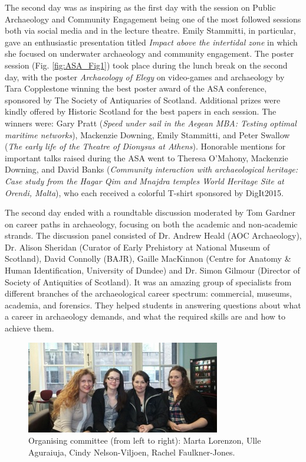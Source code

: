 	The second day was as inspiring as the first day with the session on Public Archaeology and Community Engagement being one of the most followed sessions both via social media and in the lecture theatre. Emily Stammitti, in particular, gave an enthusiastic presentation titled \textit{Impact above the intertidal zone} in which she focused on underwater archaeology and community engagement. The poster session (Fig. \ref{fig:ASA_Fig1}) took place during the lunch break on the second day, with the poster \textit{Archaeology of Elegy} on video-games and archaeology by Tara Copplestone winning the best poster award of the  ASA conference, sponsored by The Society of Antiquaries of Scotland. Additional prizes were kindly offered by Historic Scotland for the best papers in each session. The winners were: Gary Pratt (\textit{Speed under sail in the Aegean MBA: Testing optimal maritime networks}), Mackenzie Downing, Emily Stammitti, and Peter Swallow (\textit{The early life of the Theatre of Dionysus at Athens}). Honorable mentions for important talks raised during the  ASA went to Theresa O'Mahony, Mackenzie Downing, and David Banks (\textit{Community interaction with archaeological heritage: Case study from the Hagar Qim and Mnajdra temples World Heritage Site at Orendi, Malta}), who each received a colorful T-shirt sponsored by DigIt2015.
	

The second day ended with a roundtable discussion moderated by Tom Gardner on career paths in archaeology, focusing on both the academic and non-academic strands. The discussion panel consisted of Dr. Andrew Heald (AOC Archaeology), Dr. Alison Sheridan (Curator of Early Prehistory at National Museum of Scotland), David Connolly (BAJR), Gaille MacKinnon (Centre for Anatomy \& Human Identification, University of Dundee) and Dr. Simon Gilmour (Director of Society of Antiquities of Scotland). It was an amazing group of specialists from different branches of the archaeological career spectrum: commercial, museums, academia, and forensics. They helped students in answering questions about what a career in archaeology demands, and what the required skills are and how to achieve them.

\begin{figure}%
	\includegraphics[width=\linewidth]{figures/ASA_Fig2}
	\caption{Organising committee (from left to right): Marta Lorenzon, Ulle Aguraiuja, Cindy Nelson-Viljoen, Rachel Faulkner-Jones.}
	\label{fig:ASA_Fig2}
\end{figure}	

